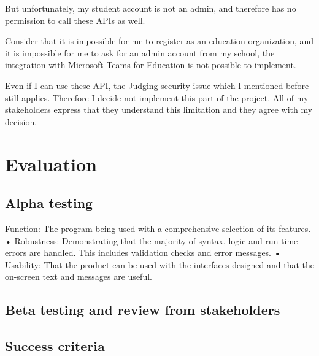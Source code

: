 \documentclass[a4paper]{report}
\begin{document}
But unfortunately, my student account is not an admin, and therefore has no permission to call these APIs as well.

Consider that it is impossible for me to register as an education organization, and it is impossible for me to ask for an admin account from my school, the integration with Microsoft Teams for Education is not possible to implement.

Even if I can use these API, the Judging security issue which I mentioned before still applies. Therefore I decide not implement this part of the project. All of my stakeholders express that they understand this limitation and they agree with my decision.

\chapter{Evaluation}

\section{Alpha testing}


Function: The program being used with a comprehensive selection of its features.
• Robustness: Demonstrating that the majority of syntax, logic and run-time errors are handled.
This includes validation checks and error messages.
• Usability: That the product can be used with the interfaces designed and that the on-screen
text and messages are useful.

\section{Beta testing and review from stakeholders}


\section{Success criteria}
\end{document}
